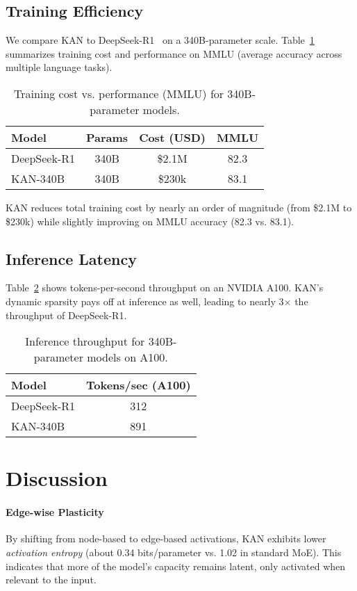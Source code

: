 \documentclass[twocolumn]{article}
\begin{document}
\subsection{Training Efficiency}
We compare KAN to DeepSeek-R1~\cite{deepseek2023} on a 340B-parameter scale. Table~\ref{tab:training} summarizes training cost and performance on MMLU (average accuracy across multiple language tasks).

\begin{table}[h]
\centering
\caption{Training cost vs. performance (MMLU) for 340B-parameter models.}
\label{tab:training}
\begin{tabular}{lccc}
\toprule
\textbf{Model} & \textbf{Params} & \textbf{Cost (USD)} & \textbf{MMLU} \\
\midrule
DeepSeek-R1 & 340B & \$2.1M & 82.3 \\
KAN-340B & 340B & \$230k & 83.1 \\
\bottomrule
\end{tabular}
\end{table}

KAN reduces total training cost by nearly an order of magnitude (from \$2.1M to \$230k) while slightly improving on MMLU accuracy (82.3 vs. 83.1).

\subsection{Inference Latency}
Table~\ref{tab:inference} shows tokens-per-second throughput on an NVIDIA A100. KAN's dynamic sparsity pays off at inference as well, leading to nearly 3$\times$ the throughput of DeepSeek-R1.

\begin{table}[h]
\centering
\caption{Inference throughput for 340B-parameter models on A100.}
\label{tab:inference}
\begin{tabular}{lc}
\toprule
\textbf{Model} & \textbf{Tokens/sec (A100)} \\
\midrule
DeepSeek-R1 & 312 \\
KAN-340B & 891 \\
\bottomrule
\end{tabular}
\end{table}

\section{Discussion}

\paragraph{Edge-wise Plasticity}
By shifting from node-based to edge-based activations, KAN exhibits lower \emph{activation entropy} (about 0.34 bits/parameter vs. 1.02 in standard MoE). This indicates that more of the model's capacity remains latent, only activated when relevant to the input.
\end{document}
